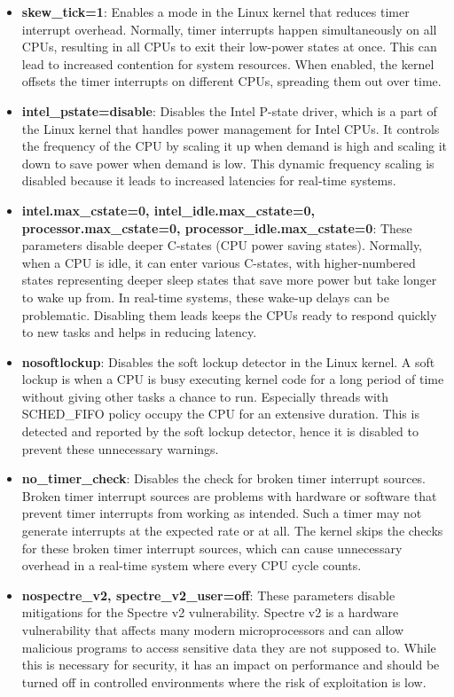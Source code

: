 \documentclass[MMR,Master,english]{twbook}
\begin{document}
\begin{itemize}
	\item \textbf{skew\_tick=1}: Enables a mode in the Linux kernel that reduces timer interrupt overhead. Normally, timer interrupts happen simultaneously on all CPUs, resulting in all CPUs to exit their low-power states at once. This can lead to increased contention for system resources. When enabled, the kernel offsets the timer interrupts on different CPUs, spreading them out over time.
	\item \textbf{intel\_pstate=disable}: Disables the Intel P-state driver, which is a part of the Linux kernel that handles power management for Intel CPUs. It controls the frequency of the CPU by scaling it up when demand is high and scaling it down to save power when demand is low. This dynamic frequency scaling is disabled because it leads to increased latencies for real-time systems.
	\item \textbf{intel.max\_cstate=0, intel\_idle.max\_cstate=0, processor.max\_cstate=0, processor\_idle.max\_cstate=0}: These parameters disable deeper C-states (CPU power saving states). Normally, when a CPU is idle, it can enter various C-states, with higher-numbered states representing deeper sleep states that save more power but take longer to wake up from. In real-time systems, these wake-up delays can be problematic. Disabling them leads keeps the CPUs ready to respond quickly to new tasks and helps in reducing latency.
	\item \textbf{nosoftlockup}: Disables the soft lockup detector in the Linux kernel. A soft lockup is when a CPU is busy executing kernel code for a long period of time without giving other tasks a chance to run. Especially threads with SCHED\_FIFO policy occupy the CPU for an extensive duration. This is detected and reported by the soft lockup detector, hence it is disabled to prevent these unnecessary warnings.
	\item \textbf{no\_timer\_check}: Disables the check for broken timer interrupt sources. Broken timer interrupt sources are problems with hardware or software that prevent timer interrupts from working as intended. Such a timer may not generate interrupts at the expected rate or at all. The kernel skips the checks for these broken timer interrupt sources, which can cause unnecessary overhead in a real-time system where every CPU cycle counts.
	\item \textbf{nospectre\_v2, spectre\_v2\_user=off}: These parameters disable mitigations for the Spectre v2 vulnerability. Spectre v2 is a hardware vulnerability that affects many modern microprocessors and can allow malicious programs to access sensitive data they are not supposed to. While this is necessary for security, it has an impact on performance and should be turned off in controlled environments where the risk of exploitation is low.

\end{itemize}
\end{document}
